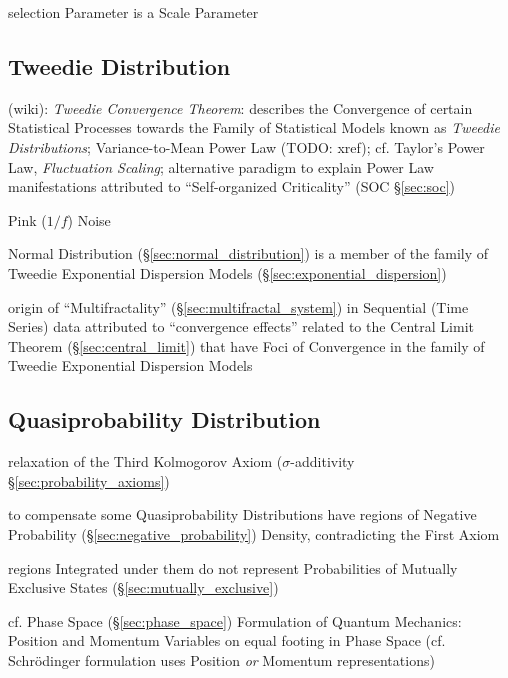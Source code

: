 selection Parameter is a Scale Parameter



\subsection{Tweedie Distribution}\label{sec:tweedie_distribution}

(wiki): \emph{Tweedie Convergence Theorem}: describes the Convergence of certain
Statistical Processes towards the Family of Statistical Models known as
\emph{Tweedie Distributions}; Variance-to-Mean Power Law (TODO: xref); cf.
Taylor's Power Law, \emph{Fluctuation Scaling}; alternative paradigm to explain
Power Law manifestations attributed to ``Self-organized Criticality''
(SOC \S\ref{sec:soc})

Pink ($1/f$) Noise

Normal Distribution (\S\ref{sec:normal_distribution}) is a member of the family
of Tweedie Exponential Dispersion Models (\S\ref{sec:exponential_dispersion})

\fist origin of ``Multifractality'' (\S\ref{sec:multifractal_system}) in
Sequential (Time Series) data attributed to ``convergence effects'' related to
the Central Limit Theorem (\S\ref{sec:central_limit}) that have Foci of
Convergence in the family of Tweedie Exponential Dispersion Models



\subsection{Quasiprobability Distribution}
\label{sec:quasiprobability_distribution}

relaxation of the Third Kolmogorov Axiom ($\sigma$-additivity
\S\ref{sec:probability_axioms})

to compensate some Quasiprobability Distributions have regions of Negative
Probability (\S\ref{sec:negative_probability}) Density, contradicting the First
Axiom

regions Integrated under them do not represent Probabilities of Mutually
Exclusive States (\S\ref{sec:mutually_exclusive})

cf. Phase Space (\S\ref{sec:phase_space}) Formulation of Quantum Mechanics:
Position and Momentum Variables on equal footing in Phase Space (cf.
Schr\"odinger formulation uses Position \emph{or} Momentum representations)

